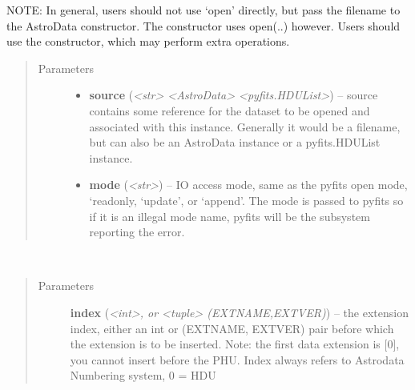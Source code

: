 \documentclass[letterpaper,10pt,english]{sphinxmanual}
\begin{document}
\begin{fulllineitems}
\begin{fulllineitems}
NOTE: In general, users should not use `open' directly, but pass
the filename to the AstroData constructor. The constructor uses
open(..) however. Users should use the constructor, which may 
perform extra operations.
\begin{quote}\begin{description}
\item[{Parameters}] \leavevmode\begin{itemize}
\item {} 
\textbf{source} (\emph{\textless{}str\textgreater{} \textbar{} \textless{}AstroData\textgreater{} \textbar{} \textless{}pyfits.HDUList\textgreater{}}) -- source contains some reference for the dataset to 
be opened and associated with this instance. Generally
it would be a filename, but can also be
an AstroData instance or a pyfits.HDUList instance.

\item {} 
\textbf{mode} (\emph{\textless{}str\textgreater{}}) -- IO access mode, same as the pyfits open mode, `readonly,
`update', or `append'.  The mode is passed to pyfits so
if it is an illegal mode name, pyfits will be the
subsystem reporting the error.

\end{itemize}

\end{description}\end{quote}

\end{fulllineitems}


\begin{fulllineitems}
\label{astro_class:astrodata.AstroData.AstroData.remove}~\begin{quote}\begin{description}
\item[{Parameters}] \leavevmode
\textbf{index} (\emph{\textless{}int\textgreater{}, or \textless{}tuple\textgreater{} (EXTNAME,EXTVER)}) -- the extension index, either an int or (EXTNAME, EXTVER)
pair before which the extension is to be inserted.
Note: the first data extension is {[}0{]}, you cannot insert 
before the PHU. Index always refers to Astrodata Numbering 
system, 0 = HDU

\end{description}\end{quote}


\end{fulllineitems}
\end{fulllineitems}
\end{document}
